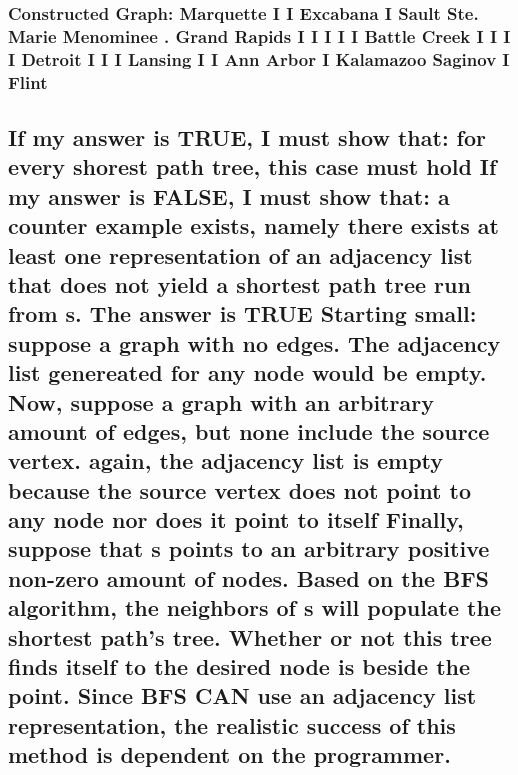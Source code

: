 \documentclass{article}
\begin{document}
\setcounter{section}{9}
\setcounter{subsection}{4}
\setcounter{subsubsection}{0}
\subsubsection{
Constructed Graph:\newline
Marquette\newline
I   I  Excabana\newline
I   Sault Ste. Marie\newline
Menominee\newline
.\newline
Grand Rapids \newline
I I I I I Battle Creek\newline
I I I I Detroit\newline
I I I Lansing\newline
I I Ann Arbor\newline
I Kalamazoo\newline
Saginov\newline
 I\newline
 Flint
}

\newpage

\setcounter{section}{1}
\setcounter{subsection}{2}
\subsection{
If my answer is TRUE, I must show that: for every shorest path tree, this case must hold\newline
If my answer is FALSE, I must show that: a counter example exists, namely there exists at least one representation of an adjacency list that does not yield a shortest path tree run from s.\newline
The answer is TRUE\newline
Starting small: suppose a graph with no edges. The adjacency list genereated for any node would be empty.\newline
Now, suppose a graph with an arbitrary amount of edges, but none include the source vertex. again, the adjacency list is empty because the source vertex does not point to any node nor does it point to itself\newline
Finally, suppose that s points to an arbitrary positive non-zero amount of nodes. Based on the BFS algorithm, the neighbors of s will populate the shortest path's tree. Whether or not this tree finds itself to the desired node is beside the point. Since BFS CAN use an adjacency list representation, the realistic success of this method is dependent on the programmer.
}
\end{document}
